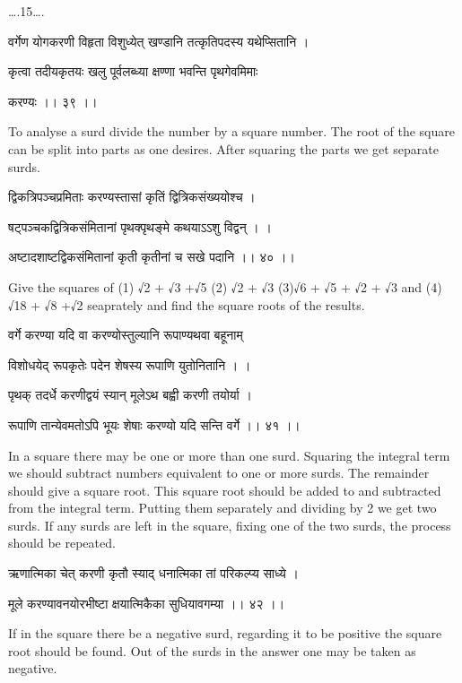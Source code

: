 \documentclass[]{article}
\date{}
\begin{document}
{\ldots{}.15\ldots{}.}

{वर्गेण योगकरणी विहृता विशुध्येत् खण्डानि तत्कृतिपदस्य यथेप्सितानि । }

{कृत्वा तदीयकृतयः खलु पूर्वलब्ध्या क्षण्णा भवन्ति पृथगेवमिमाः }

{करण्यः ।। ३९ ।। }

{To analyse a surd divide the number by a square number. The root of the
square can be split into parts as one desires. After squaring the parts
we get separate surds.}

{द्विकत्रिपञ्चप्रमिताः करण्यस्तासां कृतिं द्वित्रिकसंख्ययोश्च । }

{षट्पञ्चकद्वित्रिकसंमितानां पृथक्पृथङ्मे कथयाऽऽशु विद्वन् । । }

{अष्टादशाष्टद्विकसंमितानां कृती कृतीनां च सखे पदानि ।। ४० ।। }

{Give the squares of (1) }{√}{2 + }{√}{3 +}{√}{5 (2) }{√}{2 + }{√}{3
(3)}{√}{6 + }{√}{5 + }{√}{2 + }{√}{3 and (4) }{√}{18 + }{√}{8 +}{√}{2
seaprately and find the square roots of the results.}

{वर्गे करण्या यदि वा करण्योस्तुल्यानि रूपाण्यथवा बहूनाम् }

{विशोधयेद् रूपकृतेः पदेन शेषस्य रूपाणि युतोनितानि । । }

{पृथक् तदर्धे करणीद्वयं स्यान् मूलेऽथ बह्वी करणी तयोर्या । }

{रूपाणि तान्येवमतोऽपि भूयः शेषाः करण्यो यदि सन्ति वर्गे ।। ४१ ।। }

{In a square there may be one or more than one surd. Squaring the
integral term we should subtract numbers equivalent to one or more
surds. The remainder should give a square root. This square root should
be added to and subtracted from the integral term. Putting them
separately and dividing by 2 we get two surds. If any surds are left in
the square, fixing one of the two surds, the process should be
repeated.}

{ऋणात्मिका चेत् करणी कृतौ स्याद् धनात्मिका तां परिकल्प्य साध्ये । }

{मूले करण्यावनयोरभीष्टा क्षयात्मिकैका सुधियावगम्या ।। ४२ ।। }

{If in the square there be a negative surd, regarding it to be positive
the square root should be found. Out of the surds in the answer one may
be taken as negative.\\
}
\end{document}
